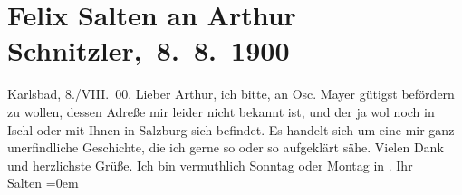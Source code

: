 

         
         \renewcommand{\erwaehntePersonen}{Personen: Oskar Mayer, Felix Salten}
         \renewcommand{\erwaehnteOrte}{Orte: Bad Ischl, Karlsbad, Salzburg}
         \renewcommand{\erwaehnteWerke}{}
               \section[ Felix Salten an Arthur Schnitzler, 8. 8. 1900]{ Felix Salten an Arthur Schnitzler, 8. 8. 1900}\nopagebreak{}\rehead{ }\begin{ledgroupsized}[t]{13cm}\normalsize\beginnumbering \toendnotes[C]{\smallbreak\pagebreak[2]} 
\toendnotes[C]{\smallbreak}\pstart
           \raggedleft{}{\pb}Karlsbad, 8./VIII. 00.\pend
           \pstart
           Lieber Arthur, ich bitte, \label{K_L03309-1v}\label{K_L03309-1h} an Osc. Mayer gütigst befördern zu wollen, dessen Adreße mir
               leider nicht bekannt ist, und der ja wol noch in Ischl oder mit Ihnen in Salzburg sich
               befindet. Es handelt sich um eine mir ganz unerfindliche Geschichte, die ich gerne so
               oder so aufgeklärt sähe.\pend
           \pstart
           Vielen Dank und herzlichste Grüße. Ich bin vermuthlich Sonntag oder Montag in \label{K_L03309-2v}\label{K_L03309-2h}.\pend
           \pstart
           Ihr {\\[\baselineskip]}\spacefill\mbox{Salten}\pend
           \leftskip=0em{}
         
         \endnumbering{}\end{ledgroupsized}  \newcommand{\dateiname}{L03309}\newcommand{\titel}{Felix Salten an Arthur Schnitzler, 8. 8. 1900}\newcommand{\editorInnen}{Martin Anton Müller und Laura Untner}
      